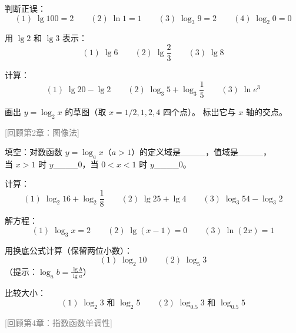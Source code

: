 \begin{exercise}[0]
判断正误：
\[
(1)\; \lg 100 = 2 \qquad (2)\; \ln 1 = 1 \qquad (3)\; \log_3 9 = 2 \qquad (4)\; \log_2 0 = 0
\]


\end{exercise}

\begin{exercise}[1]
用 \(\lg 2\) 和 \(\lg 3\) 表示：
\[
(1)\; \lg 6 \qquad (2)\; \lg \frac{2}{3} \qquad (3)\; \lg 8
\]
\end{exercise}

\begin{exercise}[1]
计算：
\[
(1)\; \lg 20 - \lg 2 \qquad (2)\; \log_3 5 + \log_3 \frac{1}{5} \qquad (3)\; \ln e^3
\]
\end{exercise}

\begin{exercise}[1]
画出 \(y = \log_2 x\) 的草图（取 \(x = 1/2, 1, 2, 4\) 四个点）。
标出它与 \(x\) 轴的交点。

\end{exercise}
\qquad \textcolor{gray}{[回顾第2章：图像法]}%

\begin{exercise}[1]
填空：对数函数 \(y = \log_a x\)（\(a > 1\)）的定义域是\_\_\_\_，值域是\_\_\_\_，\\
当 \(x > 1\) 时 \(y\)\_\_\_\_0，当 \(0 < x < 1\) 时 \(y\)\_\_\_\_0。


\end{exercise}

\begin{exercise}[2]
计算：
\[
(1)\; \log_2 16 + \log_2 \frac{1}{8} \qquad (2)\; \lg 25 + \lg 4 \qquad (3)\; \log_3 54 - \log_3 2
\]
\end{exercise}

\begin{exercise}[2]
解方程：
\[
(1)\; \log_3 x = 2 \qquad (2)\; \lg(x-1) = 0 \qquad (3)\; \ln(2x) = 1
\]
\end{exercise}

\begin{exercise}[2]
用换底公式计算（保留两位小数）：
\[
(1)\; \log_2 10 \qquad (2)\; \log_5 3
\]
（提示：\(\log_a b = \frac{\lg b}{\lg a}\)）

\end{exercise}

\begin{exercise}[2]
比较大小：
\[
(1)\; \log_2 3 \text{ 和 } \log_2 5 \qquad
(2)\; \log_{0.5} 3 \text{ 和 } \log_{0.5} 5
\]


\end{exercise}
\qquad \textcolor{gray}{[回顾第4章：指数函数单调性]}%

